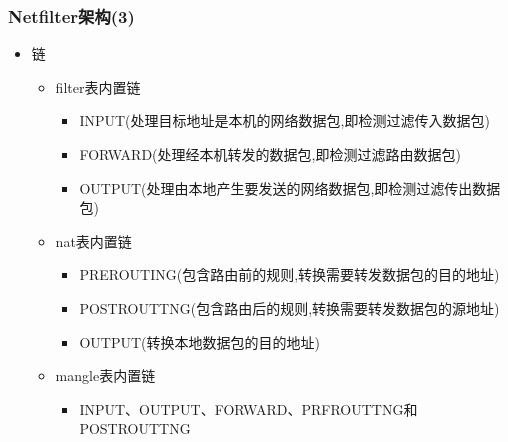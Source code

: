 \documentclass[xcolor=svgnames,presentation]{beamer}
\begin{document}
\begin{frame}
\frametitle{Netfilter架构(3)}
\label{sec-2-3}
\begin{itemize}

\item 链
\label{sec-2-3-1}%
\begin{itemize}

\item filter表内置链
\label{sec-2-3-1-1}%
\begin{itemize}

\item INPUT(处理目标地址是本机的网络数据包,即检测过滤传入数据包)
\label{sec-2-3-1-1-1}%

\item FORWARD(处理经本机转发的数据包,即检测过滤路由数据包)
\label{sec-2-3-1-1-2}%

\item OUTPUT(处理由本地产生要发送的网络数据包,即检测过滤传出数据包)
\label{sec-2-3-1-1-3}%
\end{itemize} %

\item nat表内置链
\label{sec-2-3-1-2}%
\begin{itemize}

\item PREROUTING(包含路由前的规则,转换需要转发数据包的目的地址)
\label{sec-2-3-1-2-1}%

\item POSTROUTTNG(包含路由后的规则,转换需要转发数据包的源地址)
\label{sec-2-3-1-2-2}%

\item OUTPUT(转换本地数据包的目的地址)
\label{sec-2-3-1-2-3}%
\end{itemize} %

\item mangle表内置链
\label{sec-2-3-1-3}%
\begin{itemize}

\item INPUT、OUTPUT、FORWARD、PRFROUTTNG和POSTROUTTNG
\label{sec-2-3-1-3-1}%
\end{itemize} %
\end{itemize} %
\end{itemize} %
\end{frame}
\end{document}
